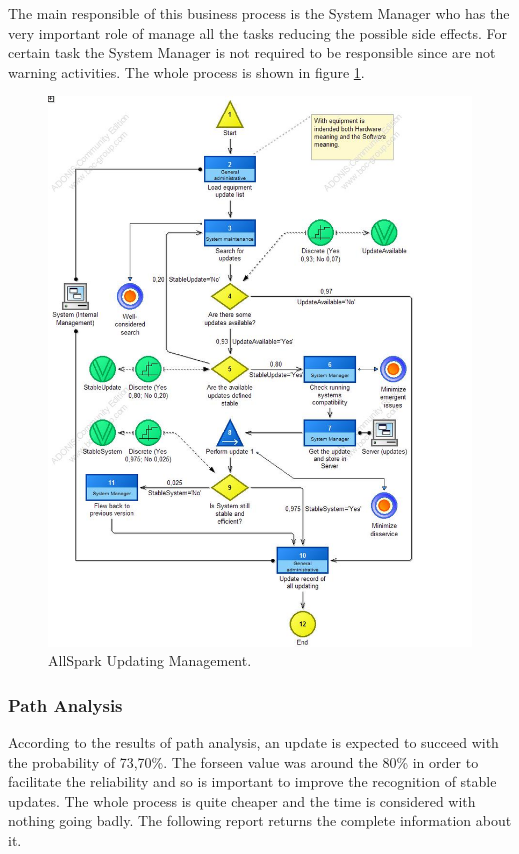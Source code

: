 The main responsible of this business process is the System Manager who has the very important role of manage all the tasks reducing the possible side effects. For certain task the System Manager is not required to be responsible since are not warning activities. The whole process is shown in figure \ref{2img:updating}.

\begin{figure}[ht!]
\begin{centering}
\includegraphics[scale=0.50]{assign2/adonis/imgs/updating.jpg}
\caption{AllSpark Updating Management.}
\label{2img:updating}
\end{centering}
\end{figure}


\subsubsection{Path Analysis}
According to the results of path analysis, an update is expected to succeed with the probability of 73,70\%. The forseen value was around the 80\% in order to facilitate the reliability and so is important to improve the recognition of stable updates. The whole process is quite cheaper and the time is considered with nothing going badly. The following report returns the complete information about it.

